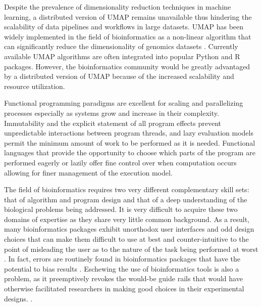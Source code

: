 \documentclass[10pt,letterpaper]{article}
\begin{document}
\begin{multicols}{2}
Despite the prevalence of dimensionality reduction techniques in
machine learning, a distributed version of UMAP remains unavailable
thus hindering the scalability of data pipelines and workflows in
large datasets. UMAP has been widely implemented in the field of
bioinformatics as a non-linear algorithm that can significantly reduce
the dimensionality of genomics datasets
\parencite{bollon2022investigating}. Currently available UMAP
algorithms are often integrated into popular Python and R
packages. However, the bioinformatics community would be greatly
advantaged by a distributed version of UMAP because of the increased
scalability and resource utilization.

Functional programming paradigms are excellent for scaling and
parallelizing processes especially as systems grow and increase in
their complexity. Immutability and the explicit statement of all
program effects prevent unpredictable interactions between program
threads, and lazy evaluation models permit the minimum amount of work
to be performed as it is needed. Functional languages that provide the
opportunity to choose which parts of the program are performed eagerly
or lazily offer fine control over when computation occurs allowing for
finer management of the execution model.

The field of bioinformatics requires two very different complementary
skill sets: that of algorithm and program design and that of a deep
understanding of the biological problems being addressed. It is very
difficult to acquire these two domains of expertise as they share very
little common background. As a result, many bioinformatics packages
exhibit unorthodox user interfaces and odd design choices that can
make them difficult to use at best and counter-intuitive to the point of
misleading the user as to the nature of the task being performed at
worst \parencite{shah2019misunderstood}. In fact, errors are routinely
found in bioinformatics packages that have the potential to bias
results \parencite{chen2009innovative}. Eschewing the use of
bioinformatics tools is also a problem, as it preemptively revokes the
would-be guide rails that would have otherwise facilitated researchers
in making good choices in their experimental designs.
\parencite{biron2006pitfalls}.



\end{multicols}
\end{document}
